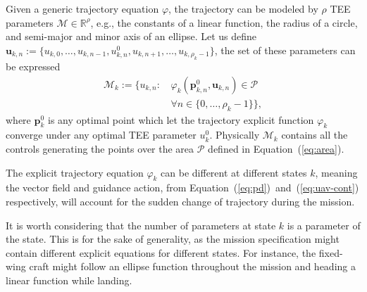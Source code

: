 \documentclass[letterpaper,10pt,conference]{ieeeconf}
\begin{document}
Given a generic trajectory equation $\varphi$, the trajectory can be modeled by $\rho$ TEE parameters $\mathcal{M}\in\mathbb{R}^\rho$, e.g., the constants of a linear function, the radius of a circle, and semi-major and minor axis of an ellipse. Let us define $\mathbf{u}_{k,n}:=\{u_{k,0},\dots,u_{k,n-1},u_{k,n}^0,u_{k,n+1},\dots,u_{k,\rho_k-1}\}$, the set of these parameters can be expressed
\begin{equation}\label{eq:tee-def}\begin{split}
  \mathcal{M}_k:=\{u_{k,n} : \,
  &\varphi_k(\mathbf{p}_{k,n}^0,\mathbf{u}_{k,n})\in\mathcal{P}\\
  &\forall n\in\{0,\dots,\rho_k-1\}\},
\end{split}\end{equation}
where $\mathbf{p}_k^0$ is any optimal point which let the trajectory explicit function $\varphi_k$ converge under any optimal TEE parameter $u_k^0$. Physically $\mathcal{M}_k$ contains all the controls generating the points over the area $\mathcal{P}$ defined in Equation~(\ref{eq:area}). 

The explicit trajectory equation $\varphi_k$ can be different at different states $k$, meaning the vector field and guidance action, from Equation~(\ref{eq:pd})~and~(\ref{eq:uav-cont}) respectively, will account for the sudden change of trajectory during the mission.

It is worth considering that the number of parameters at state $k$ is a parameter of the state. This is for the sake of generality, as the mission specification might contain different explicit equations for different states. For instance, the fixed-wing craft might follow an ellipse function throughout the mission and heading a linear function while landing. 
\end{document}
